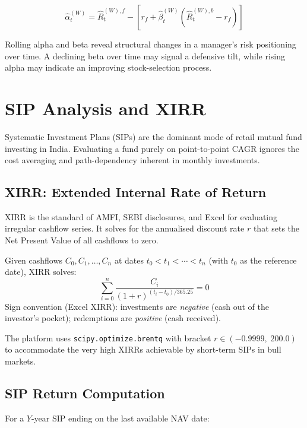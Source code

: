 \documentclass[12pt, a4paper]{article}
\newcommand{\rf}{r_f}
\begin{document}
\[
  \hat{\alpha}_t^{(W)} = \hat{R}_t^{(W),f} - \left[\rf + \hat{\beta}_t^{(W)}\left(\hat{R}_t^{(W),b} - \rf\right)\right]
\]

Rolling alpha and beta reveal structural changes in a manager's risk
positioning over time.  A declining beta over time may signal a defensive
tilt, while rising alpha may indicate an improving stock-selection process.

\section{SIP Analysis and XIRR}

Systematic Investment Plans (SIPs) are the dominant mode of retail mutual
fund investing in India.  Evaluating a fund purely on point-to-point CAGR
ignores the cost averaging and path-dependency inherent in monthly
investments.

\subsection{XIRR: Extended Internal Rate of Return}

XIRR is the standard of AMFI, SEBI disclosures, and Excel for evaluating
irregular cashflow series.  It solves for the annualised discount rate $r$
that sets the Net Present Value of all cashflows to zero.

\begin{definition}[XIRR]
Given cashflows $C_0, C_1, \ldots, C_n$ at dates $t_0 < t_1 < \cdots < t_n$
(with $t_0$ as the reference date), XIRR solves:
\[
  \sum_{i=0}^{n} \frac{C_i}{(1 + r)^{(t_i - t_0)/365.25}} = 0
\]
Sign convention (Excel XIRR): investments are \emph{negative} (cash
out of the investor's pocket); redemptions are \emph{positive} (cash
received).
\end{definition}

The platform uses \texttt{scipy.optimize.brentq} with bracket
$r \in (-0.9999,\; 200.0)$ to accommodate the very high XIRRs achievable
by short-term SIPs in bull markets.

\subsection{SIP Return Computation}

For a $Y$-year SIP ending on the last available NAV date:
\end{document}
